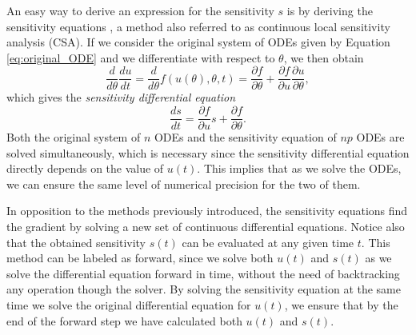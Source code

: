 An easy way to derive an expression for the sensitivity $s$ is by deriving the sensitivity equations \cite{ramsay2017dynamic}, a method also referred to as continuous local sensitivity analysis (CSA). 
If we consider the original system of ODEs given by Equation \eqref{eq:original_ODE} and we differentiate with respect to $\theta$, we then obtain
\begin{equation}
 \frac{d}{d\theta} \frac{du}{dt} 
 =
 \frac{d}{d\theta} f(u(\theta), \theta, t)
 = 
 \frac{\partial f}{\partial \theta}
 + 
 \frac{\partial f}{\partial u} \frac{\partial u}{\partial \theta},
\end{equation}
which gives the \textit{sensitivity differential equation} 
\begin{equation}
 \frac{ds}{dt} = \frac{\partial f}{\partial u} s + \frac{\partial f}{\partial \theta}.
 \label{eq:sensitivity_equations}
\end{equation}
Both the original system of $n$ ODEs and the sensitivity equation of $np$ ODEs are solved simultaneously, which is necessary since the sensitivity differential equation directly depends on the value of $u(t)$.  
This implies that as we solve the ODEs, we can ensure the same level of numerical precision for the two of them.

In opposition to the methods previously introduced, the sensitivity equations find the gradient by solving a new set of continuous differential equations.
Notice also that the obtained sensitivity $s(t)$ can be evaluated at any given time $t$. 
This method can be labeled as forward, since we solve both $u(t)$ and $s(t)$ as we solve the differential equation forward in time, without the need of backtracking any operation though the solver.
By solving the sensitivity equation at the same time we solve the original differential equation for $u(t)$, we ensure that by the end of the forward step we have calculated both $u(t)$ and $s(t)$. 

